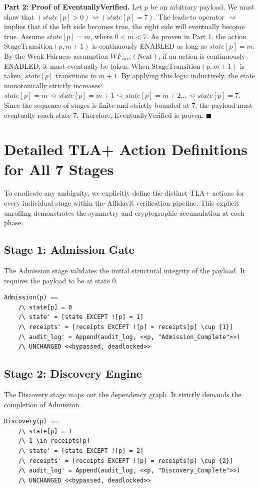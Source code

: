 \textbf{Part 2: Proof of EventuallyVerified.}
Let $p$ be an arbitrary payload. We must show that $(state[p] > 0) \rightsquigarrow (state[p] = 7)$. The leads-to operator $\rightsquigarrow$ implies that if the left side becomes true, the right side will eventually become true.
Assume $state[p] = m$, where $0 < m < 7$.
As proven in Part 1, the action $\text{StageTransition}(p, m+1)$ is continuously ENABLED as long as $state[p] = m$.
By the Weak Fairness assumption $WF_{vars}(\text{Next})$, if an action is continuously ENABLED, it must eventually be taken.
When $\text{StageTransition}(p, m+1)$ is taken, $state[p]$ transitions to $m+1$.
By applying this logic inductively, the state monotonically strictly increases:
$state[p] = m \rightsquigarrow state[p] = m+1 \rightsquigarrow state[p] = m+2 \dots \rightsquigarrow state[p] = 7$.
Since the sequence of stages is finite and strictly bounded at 7, the payload must eventually reach state 7.
Therefore, $\text{EventuallyVerified}$ is proven. $\blacksquare$

\section{Detailed TLA+ Action Definitions for All 7 Stages}
To eradicate any ambiguity, we explicitly define the distinct TLA+ actions for every individual stage within the Affidavit verification pipeline. This explicit unrolling demonstrates the symmetry and cryptographic accumulation at each phase.

\subsection{Stage 1: Admission Gate}
The Admission stage validates the initial structural integrity of the payload. It requires the payload to be at state 0.
\begin{verbatim}
Admission(p) ==
    /\ state[p] = 0
    /\ state' = [state EXCEPT ![p] = 1]
    /\ receipts' = [receipts EXCEPT ![p] = receipts[p] \cup {1}]
    /\ audit_log' = Append(audit_log, <<p, "Admission_Complete">>)
    /\ UNCHANGED <<bypassed, deadlocked>>
\end{verbatim}

\subsection{Stage 2: Discovery Engine}
The Discovery stage maps out the dependency graph. It strictly demands the completion of Admission.
\begin{verbatim}
Discovery(p) ==
    /\ state[p] = 1
    /\ 1 \in receipts[p]
    /\ state' = [state EXCEPT ![p] = 2]
    /\ receipts' = [receipts EXCEPT ![p] = receipts[p] \cup {2}]
    /\ audit_log' = Append(audit_log, <<p, "Discovery_Complete">>)
    /\ UNCHANGED <<bypassed, deadlocked>>
\end{verbatim}

